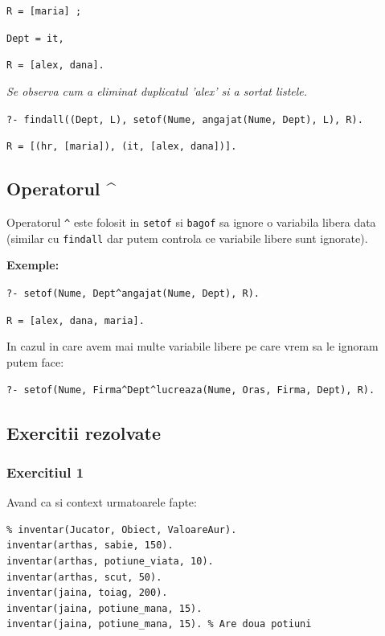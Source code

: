 \texttt{R = [maria] ;}

\texttt{Dept = it,}

\texttt{R = [alex, dana].}

\textit{Se observa cum a eliminat duplicatul 'alex' si a sortat listele.}

\vspace{\baselineskip}

\texttt{?- findall((Dept, L), setof(Nume, angajat(Nume, Dept), L), R).}

\texttt{R = [(hr, [maria]), (it, [alex, dana])].}




\subsection*{Operatorul \^{}}

Operatorul \texttt{\^{}} este folosit in \texttt{setof} si \texttt{bagof} sa ignore o variabila libera data (similar cu \texttt{findall}
dar putem controla ce variabile libere sunt ignorate).

\textbf{Exemple:}

\texttt{?- setof(Nume, Dept\^{}angajat(Nume, Dept), R).}

\texttt{R = [alex, dana, maria].}

In cazul in care avem mai multe variabile libere pe care vrem sa le ignoram putem face:

\texttt{?- setof(Nume, Firma\^{}Dept\^{}lucreaza(Nume, Oras, Firma, Dept), R).}





\subsection*{Exercitii rezolvate}

\subsubsection*{Exercitiul 1}

Avand ca si context urmatoarele fapte:

\begin{lstlisting}
% inventar(Jucator, Obiect, ValoareAur).
inventar(arthas, sabie, 150).
inventar(arthas, potiune_viata, 10).
inventar(arthas, scut, 50).
inventar(jaina, toiag, 200).
inventar(jaina, potiune_mana, 15).
inventar(jaina, potiune_mana, 15). % Are doua potiuni
\end{lstlisting}

